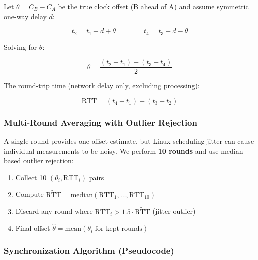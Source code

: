 \documentclass[11pt,a4paper]{article}
\begin{document}
Let $\theta = C_B - C_A$ be the true clock offset (B ahead of A) and assume symmetric one-way delay $d$:

\begin{equation}
t_2 = t_1 + d + \theta \qquad\qquad t_4 = t_3 + d - \theta
\end{equation}

Solving for $\theta$:

\begin{equation}
\theta = \frac{(t_2 - t_1) + (t_3 - t_4)}{2}
\label{eq:offset}
\end{equation}

The round-trip time (network delay only, excluding processing):

\begin{equation}
\text{RTT} = (t_4 - t_1) - (t_3 - t_2)
\label{eq:rtt}
\end{equation}

\subsubsection{Multi-Round Averaging with Outlier Rejection}

A single round provides one offset estimate, but Linux scheduling jitter can cause individual measurements to be noisy. We perform \textbf{10 rounds} and use median-based outlier rejection:

\begin{enumerate}
  \item Collect 10 $(\theta_i, \text{RTT}_i)$ pairs
  \item Compute $\tilde{\text{RTT}} = \text{median}(\text{RTT}_1, \ldots, \text{RTT}_{10})$
  \item Discard any round where $\text{RTT}_i > 1.5 \cdot \tilde{\text{RTT}}$ (jitter outlier)
  \item Final offset $\hat{\theta} = \text{mean}(\theta_i \text{ for kept rounds})$
\end{enumerate}

\subsubsection{Synchronization Algorithm (Pseudocode)}
\end{document}

